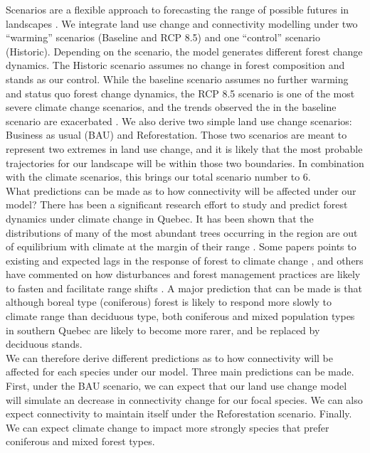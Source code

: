 \documentclass[12pt,Bold,TexShade]{mcgilletdclass}
\begin{document}
{%
Scenarios are a flexible approach to forecasting the range of possible futures in landscapes \citep{peterson_scenario_2003}. We integrate land use change and connectivity modelling under two “warming” scenarios (Baseline and RCP 8.5) and one “control” scenario (Historic).
Depending on the scenario, the model generates different forest change dynamics. The Historic scenario assumes no change in forest composition and stands as our control. While the baseline scenario assumes no further warming and status quo forest change dynamics, the RCP 8.5 scenario is one of the most severe climate change scenarios, and the trends observed the in the baseline scenario are exacerbated \cite{IPCC}. We also derive two simple land use change scenarios: Business as usual (BAU) and Reforestation. Those two scenarios are meant to represent two extremes in land use change, and it is likely that the most probable trajectories for our landscape will be within those two boundaries. In combination with the climate scenarios, this brings our total scenario number to 6. \\

What predictions can be made as to how connectivity will be affected under our model? There has been a significant research effort to study and predict forest dynamics under climate change in Quebec. It has been shown that the distributions of many of the most abundant trees occurring in the region are out of equilibrium with climate at the margin of their range \citep{talluto_extinction_2017}. Some papers points to existing and expected lags in the response of forest to climate change \citep{savage_elevational_2015,}, and others have commented on how disturbances and forest management practices are likely to fasten and facilitate range shifts \citep{leithead_northward_2010, boulanger_climate_2019, vieira_paying_2020}. A major prediction that can be made is that although boreal type (coniferous) forest is likely to respond more slowly to climate range than deciduous type, both coniferous and mixed population types in southern Quebec are likely to become more rarer, and be replaced by deciduous stands. \\

We can therefore derive different predictions as to how connectivity will be affected for each species under our model. Three main predictions can be made. First, under the BAU scenario, we can expect that our land use change model will simulate an decrease in connectivity change for our focal species. We can also expect connectivity to maintain itself under the Reforestation scenario. Finally. We can expect climate change to impact more strongly species that prefer coniferous  and mixed forest types. \\
}%
\Intro
\end{document}
